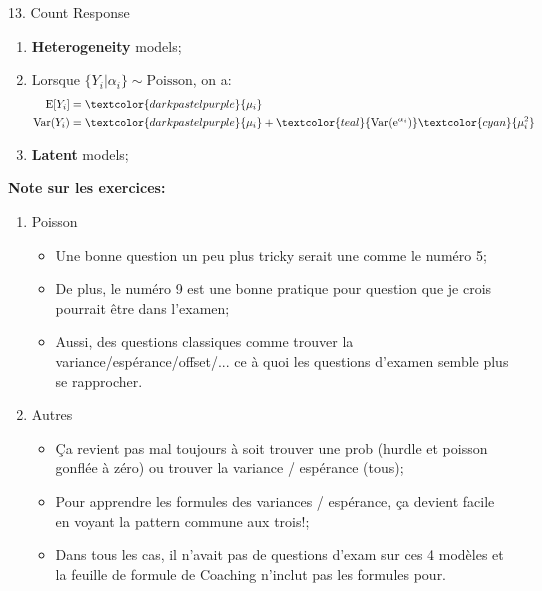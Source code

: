 \documentclass[12pt, titlepage, french]{report}
\begin{document}
\begin{CHPT_SUMM}[label = {GLM-COUNT}]{13. Count Response}
\begin{enumerate}
\begin{enumerate}
\begin{align*}
			&\text{De plus, on trouve: } \\
			k < 1 &\Rightarrow 1 - k > 0 \therefore \text{Var} > \text{E}	\\
			k > 1 &\Rightarrow 1 - k < 0 \therefore \text{Var} < \text{E}	
		\end{align*}
		où $k = \frac{1 - \pi}{1 - h(0)}$
		\item	\textbf{Heterogeneity} models;
		\item[] Lorsque $\{Y_{i} | \alpha_{i} \} \sim \text{Poisson}$, on a:
		\begin{align*}
			\text{E}[Y_{i}]		&=	\textcolor{darkpastelpurple}{\mu_{i}}	\\
			\text{Var}(Y_{i})	&=	\textcolor{darkpastelpurple}{\mu_{i}} + \textcolor{teal}{\text{Var}(\text{e}^{\alpha_{i}})} \textcolor{cyan}{\mu_{i}^{2}}
		\end{align*}
		\item	\textbf{Latent} models;
	\end{enumerate}
\end{enumerate}
\textbf{Note sur les exercices:} 
\begin{enumerate}
	\item	Poisson
	\begin{itemize}
		\item	Une bonne question un peu plus tricky serait une comme le numéro 5;
		\item	De plus, le numéro 9 est une bonne pratique pour question que je crois pourrait être dans l'examen;
		\item	Aussi, des questions classiques comme trouver la variance/espérance/offset/... ce à quoi les questions d'examen semble plus se rapprocher.
	\end{itemize}
	\item	Autres
	\begin{itemize}
		\item	Ça revient pas mal toujours à soit trouver une prob (hurdle et poisson gonflée à zéro) ou trouver la variance / espérance (tous);
		\item	Pour apprendre les formules des variances / espérance, ça devient facile en voyant la pattern commune aux trois!;
		\item	Dans tous les cas, il n'avait pas de questions d'exam sur ces 4 modèles et la feuille de formule de Coaching n'inclut pas les formules pour.
	\end{itemize}
\end{enumerate}
\end{CHPT_SUMM}
\end{document}

